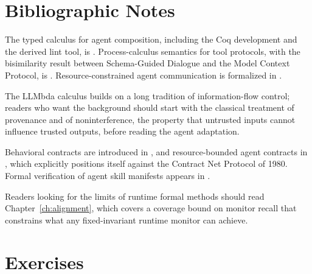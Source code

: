 \section*{Bibliographic Notes}

The typed calculus for agent composition, including the Coq development and the
derived lint tool, is \cite{lambdaA2026}. Process-calculus semantics for tool
protocols, with the bisimilarity result between Schema-Guided Dialogue and the
Model Context Protocol, is \cite{toolcalculus2026}. Resource-constrained agent
communication is formalized in \cite{uacp2026}.

The LLMbda calculus \cite{llmbda2026} builds on a long tradition of
information-flow control; readers who want the background should start with the classical treatment of provenance and of noninterference, the property that untrusted inputs cannot influence trusted outputs, before reading the agent adaptation.

Behavioral contracts are introduced in \cite{agentcontracts2026}, and
resource-bounded agent contracts in \cite{resourcecontracts2026}, which
explicitly positions itself against the Contract Net Protocol of 1980. Formal
verification of agent skill manifests appears in \cite{skillverify2026}.

Readers looking for the limits of runtime formal methods should read
Chapter~\ref{ch:alignment}, which covers a coverage bound on monitor recall that
constrains what any fixed-invariant runtime monitor can achieve.

\section*{Exercises}

